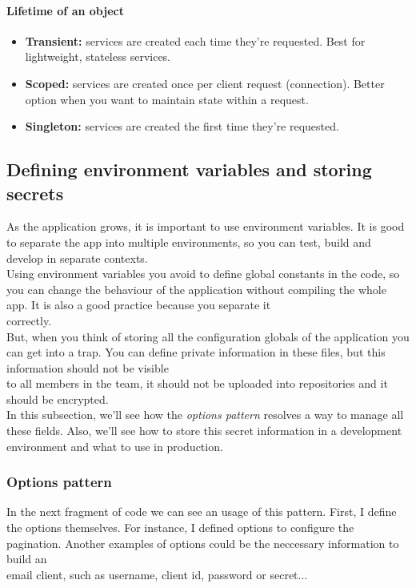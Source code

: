             \paragraph{Lifetime of an object}
            \begin{itemize}
                \item \textbf{Transient:} services are created each time they're requested. Best for lightweight, stateless services.
                \item \textbf{Scoped:} services are created once per client request (connection). Better option when you want to maintain state within a request.
                \item \textbf{Singleton:} services are created the first time they're requested.
            \end{itemize}

    \subsection{Defining environment variables and storing secrets}
    As the application grows, it is important to use environment variables. It is good to separate the app into multiple environments, so you can test, build and develop in separate contexts. \\
    Using environment variables you avoid to define global constants in the code, so you can change the behaviour of the application without compiling the whole app. It is also a good practice because you separate it \\
    correctly. \\
    
    But, when you think of storing all the configuration globals of the application you can get into a trap. You can define private information in these files, but this information should not be visible \\
    to all members in the team, it should not be uploaded into repositories and it should be encrypted. \\

    In this subsection, we'll see how the \textit{options pattern} resolves a way to manage all these fields. Also, we'll see how to store this secret information in a development environment and what to use in production. \\

        \subsubsection{Options pattern}
        In the next fragment of code we can see an usage of this pattern. First, I define the options themselves. For instance, I defined options to configure the pagination. Another examples of options could be the neccessary information to build an \\
        email client, such as username, client id, password or secret... \\
        
